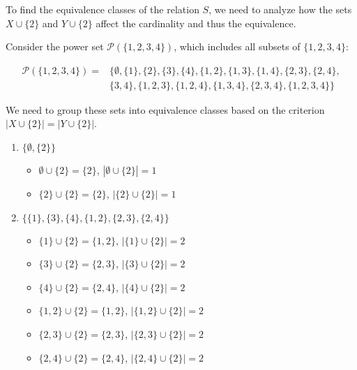\begin{solution}
To find the equivalence classes of the relation $S$, we need to analyze how the sets $X \cup \{2\}$ and $Y \cup \{2\}$ affect the cardinality and thus the equivalence.

Consider the power set $\mathcal{P}(\{1, 2, 3, 4\})$, which includes all subsets of $\{1, 2, 3, 4\}$:

\[
\begin{aligned}
\mathcal{P}(\{1, 2, 3, 4\}) = & \{\emptyset, \{1\}, \{2\}, \{3\}, \{4\}, \{1, 2\}, \{1, 3\}, \{1, 4\}, \{2, 3\}, \{2, 4\}, \\
& \{3, 4\}, \{1, 2, 3\}, \{1, 2, 4\}, \{1, 3, 4\}, \{2, 3, 4\}, \{1, 2, 3, 4\}\}
\end{aligned}
\]

We need to group these sets into equivalence classes based on the criterion $|X \cup \{2\}| = |Y \cup \{2\}|$.

\begin{enumerate}[label=\textbf{Class \arabic*:}, itemsep=10pt]

\item $\{\emptyset, \{2\}\}$
    \begin{itemize}
    \item $\emptyset \cup \{2\} = \{2\}$, $|\emptyset \cup \{2\}| = 1$
    \item $\{2\} \cup \{2\} = \{2\}$, $|\{2\} \cup \{2\}| = 1$
    \end{itemize}

\item $\{\{1\}, \{3\}, \{4\}, \{1, 2\}, \{2, 3\}, \{2, 4\}\}$
    \begin{itemize}
    \item $\{1\} \cup \{2\} = \{1, 2\}$, $|\{1\} \cup \{2\}| = 2$
    \item $\{3\} \cup \{2\} = \{2, 3\}$, $|\{3\} \cup \{2\}| = 2$
    \item $\{4\} \cup \{2\} = \{2, 4\}$, $|\{4\} \cup \{2\}| = 2$
    \item $\{1, 2\} \cup \{2\} = \{1, 2\}$, $|\{1, 2\} \cup \{2\}| = 2$
    \item $\{2, 3\} \cup \{2\} = \{2, 3\}$, $|\{2, 3\} \cup \{2\}| = 2$
    \item $\{2, 4\} \cup \{2\} = \{2, 4\}$, $|\{2, 4\} \cup \{2\}| = 2$
    \end{itemize}


\end{enumerate}
\end{solution}
